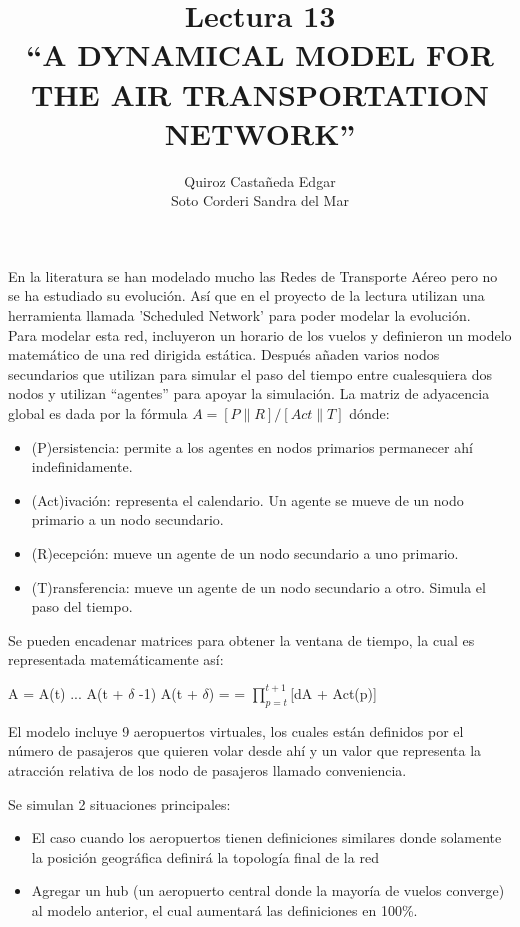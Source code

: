 \documentclass[12pt]{extreport}
\title{
	Lectura 13\\ 
	``A DYNAMICAL MODEL FOR THE AIR TRANSPORTATION NETWORK''
	}
\author{
	Quiroz Castañeda Edgar \\
	Soto Corderi Sandra del Mar
	}
\makeatletter
\renewcommand{\maketitle}{
	\bgroup\setlength{\parindent}{0pt}

	\begin{flushright}
		\@author
	\end{flushright}

	\begin{flushleft}
		\textbf{\@title}
	\end{flushleft}

	\egroup
}
\makeatother
\begin{document}
	\maketitle
	
	En la literatura se han modelado mucho las Redes de Transporte Aéreo pero no se ha estudiado su evolución. Así que en el proyecto de la lectura utilizan una herramienta llamada 'Scheduled Network' para poder modelar la evolución.\\
	
	Para modelar esta red, incluyeron un horario de los vuelos y definieron un modelo matemático de una red dirigida estática. Después añaden varios nodos secundarios que utilizan para
	simular el paso del tiempo entre cualesquiera dos nodos y  utilizan
	``agentes'' para apoyar la simulación. La matriz de adyacencia global es dada por la fórmula $A = [ P \| R ] / [Act \| T]$ dónde:
	\begin{itemize}
		\item{(P)ersistencia: permite a los agentes en nodos primarios permanecer ahí
			indefinidamente.}
		\item{(Act)ivación: representa el calendario. Un agente se mueve de un nodo
			primario a un nodo secundario.}
		\item{(R)ecepción: mueve un agente de un nodo secundario a uno primario.}
		\item{(T)ransferencia: mueve un agente de un nodo secundario a otro. Simula
			el paso del tiempo.}
	\end{itemize}
	
	Se pueden encadenar matrices para obtener la ventana de tiempo, la cual es representada matemáticamente así:
	\begin{center}
		A = A(t) ... A(t + $\delta$ -1) A(t + $\delta$) = 
		= $\prod^{t+1}_{p=t}$[dA + Act(p)]
	\end{center}
		
	El modelo incluye 9 aeropuertos virtuales, los cuales están definidos por el número de pasajeros que quieren volar desde ahí y un valor que representa la atracción relativa de los nodo de pasajeros llamado conveniencia. 

	Se simulan 2 situaciones principales:
	\begin{itemize}
		\item 
		El caso cuando los aeropuertos tienen definiciones similares donde solamente la posición geográfica definirá la topología final de la red
		\item 
		Agregar un hub (un aeropuerto central donde la mayoría de vuelos converge) al modelo anterior, el cual aumentará las definiciones en 100\%.
	\end{itemize} 
	
\end{document}
